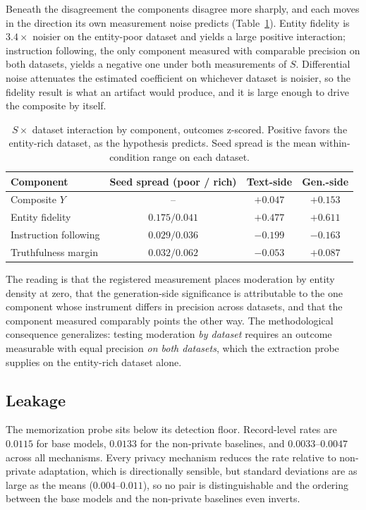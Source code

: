 Beneath the disagreement the components disagree more sharply,
and each moves in the direction its own measurement noise predicts (Table~\ref{tab:moderation}).
Entity fidelity is $3.4\times$ noisier on the entity-poor dataset and yields a large positive interaction;
instruction following,
the only component measured with comparable precision on both datasets,
yields a negative one under both measurements of $S$. Differential noise attenuates the estimated coefficient on whichever dataset is noisier,
so the fidelity result is what an artifact would produce,
and it is large enough to drive the composite by itself.

\begin{table}[t]
  \centering
  \caption{$S \times$ dataset interaction by component,
  outcomes z-scored.
  Positive favors the entity-rich dataset,
  as the hypothesis predicts.
  Seed spread is the mean within-condition range on each dataset.}
  \label{tab:moderation}
  \begin{tabular}{lccc}
    \toprule
    Component & Seed spread (poor / rich) & Text-side & Gen.-side \\
    \midrule
    Composite $Y$         & --             & $+0.047$ & $+0.153$ \\
    Entity fidelity       & $0.175 / 0.041$ & $+0.477$ & $+0.611$ \\
    Instruction following & $0.029 / 0.036$ & $-0.199$ & $-0.163$ \\
    Truthfulness margin   & $0.032 / 0.062$ & $-0.053$ & $+0.087$ \\
    \bottomrule
  \end{tabular}
\end{table}

The reading is that the registered measurement places moderation by entity density at zero,
that the generation-side significance is attributable to the one component whose instrument differs in precision across datasets,
and that the component measured comparably points the other way.
The methodological consequence generalizes:
testing moderation \textit{by dataset} requires an outcome measurable with equal precision \textit{on both datasets},
which the extraction probe supplies on the entity-rich dataset alone.

\subsection{\label{apx:leakage}Leakage}
The memorization probe sits below its detection floor.
Record-level rates are $0.0115$ for base models,
$0.0133$ for the non-private baselines,
and $0.0033$--$0.0047$ across all mechanisms.
Every privacy mechanism reduces the rate relative to non-private adaptation,
which is directionally sensible,
but standard deviations are as large as the means ($0.004$--$0.011$),
so no pair is distinguishable and the ordering between the base models and the non-private baselines even inverts.


